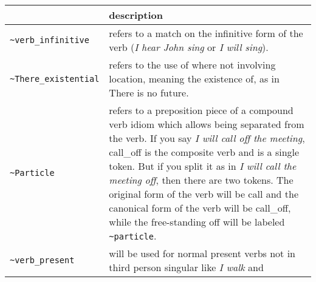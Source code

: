 \documentclass[]{article}
\begin{document}
\begin{longtable}[]{@{}ll@{}}
\toprule
\begin{minipage}[b]{0.30\columnwidth}\raggedright\strut
\strut
\end{minipage} & \begin{minipage}[b]{0.20\columnwidth}\raggedright\strut
description\strut
\end{minipage}\tabularnewline
\midrule
\endhead
\begin{minipage}[t]{0.30\columnwidth}\raggedright\strut
\texttt{\textasciitilde{}verb\_infinitive}\strut
\end{minipage} & \begin{minipage}[t]{0.20\columnwidth}\raggedright\strut
refers to a match on the infinitive form of the verb (\emph{I hear John
sing} or \emph{I will sing}).\strut
\end{minipage}\tabularnewline
\begin{minipage}[t]{0.30\columnwidth}\raggedright\strut
\texttt{\textasciitilde{}There\_existential}\strut
\end{minipage} & \begin{minipage}[t]{0.20\columnwidth}\raggedright\strut
refers to the use of where not involving location, meaning the existence
of, as in There is no future.\strut
\end{minipage}\tabularnewline
\begin{minipage}[t]{0.30\columnwidth}\raggedright\strut
\texttt{\textasciitilde{}Particle}\strut
\end{minipage} & \begin{minipage}[t]{0.20\columnwidth}\raggedright\strut
refers to a preposition piece of a compound verb idiom which allows
being separated from the verb. If you say \emph{I will call off the
meeting}, call\_off is the composite verb and is a single token. But if
you split it as in \emph{I will call the meeting off}, then there are
two tokens. The original form of the verb will be call and the canonical
form of the verb will be call\_off, while the free-standing off will be
labeled \texttt{\textasciitilde{}particle}.\strut
\end{minipage}\tabularnewline
\begin{minipage}[t]{0.30\columnwidth}\raggedright\strut
\texttt{\textasciitilde{}verb\_present}\strut
\end{minipage} & \begin{minipage}[t]{0.20\columnwidth}\raggedright\strut
will be used for normal present verbs not in third person singular like
\emph{I walk} and\strut

\end{minipage}
\end{longtable}
\end{document}
